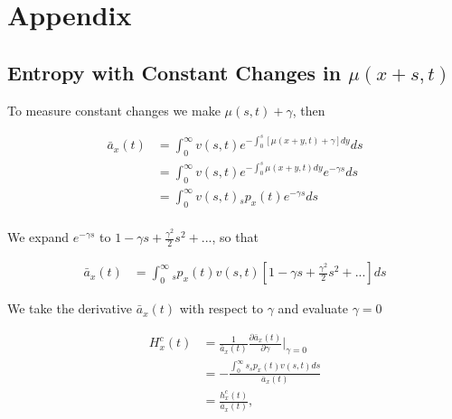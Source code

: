 \documentclass[12pt]{article}
\begin{document}
\newpage


%
%



\newpage


\FloatBarrier
\newpage
\appendix
\section{Appendix}


\subsection{Entropy with Constant Changes in $\mu(x+s,t)$}\label{sec:EntropyConst}

To measure constant changes we make $\mu(s,t)+\gamma$, then

\begin{equation}\label{eq:EntropyConst1}
\begin{split}
\bar{a}_{x}(t) &= \int_0^\infty{v}(s,t) e^{-\int_{0}^{s} [\mu(x+y,t)+\gamma]dy}ds \\
&= \int_0^\infty {v}(s,t)e^{-\int_{0}^{s} \mu(x+y,t)dy} e^{-\gamma s}ds \\
&= \int_0^\infty {v}(s,t){}_sp_x(t) e^{-\gamma s}ds \\
\end{split}
\end{equation}

We expand $e^{-\gamma s}$ to $1-\gamma s+\frac{\gamma^2}{2} s^{2} +...$, so that


\begin{equation}\label{eq:EntropyConst2}
\begin{split}
\bar{a}_{x}(t) &= \int_0^\infty {}_sp_x(t) {v}(s,t)[1-\gamma s+\frac{\gamma^2}{2} s^{2} +...]ds
\end{split}
\end{equation}

We take the derivative $\bar{a}_{x}(t)$ with respect to $\gamma$ and evaluate $\gamma=0$


\begin{equation}\label{eq:EntropyConst3}
\begin{split}
{H}^{c}_x(t)&=\frac{1}{\bar{a}_x(t)}\frac{\partial \bar{a}_x(t)}{\partial \gamma} \bigg\rvert_{\gamma=0}\\
&= -\frac{\int_0^\infty s {}_sp_x(t) {v}(s,t)ds}{\bar{a}_x(t)} \\
&= \frac{{h}^{c}_x(t)}{\bar{a}_x(t)},
\end{split}
\end{equation}
\end{document}
